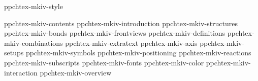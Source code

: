




\environment ppchtex-mkiv-style

\startdocument

    \component ppchtex-mkiv-contents
    \component ppchtex-mkiv-introduction
    \component ppchtex-mkiv-structures
    \component ppchtex-mkiv-bonds
    \component ppchtex-mkiv-frontviews
    \component ppchtex-mkiv-definitions
    \component ppchtex-mkiv-combinations
    \component ppchtex-mkiv-extratext
    \component ppchtex-mkiv-axis
    \component ppchtex-mkiv-setups
    \component ppchtex-mkiv-symbols
    \component ppchtex-mkiv-positioning
    \component ppchtex-mkiv-reactions
    \component ppchtex-mkiv-subscripts
    \component ppchtex-mkiv-fonts
    \component ppchtex-mkiv-color
    \component ppchtex-mkiv-interaction
    \component ppchtex-mkiv-overview

\stopdocument
